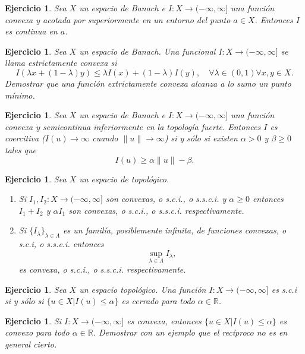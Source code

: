 \documentclass{article}
\newcounter{ejer}
\newtheorem{ejercicio}[ejer]{Ejercicio}}
\newcommand{\rr}{\mathbb{R}}
\begin{document}
\begin{ejercicio} Sea $X$ un espacio de Banach
e $I:X\to (-\infty,\infty]$ una función convexa y acotada por superiormente  en
un entorno del punto $a\in X$.  Entonces  $I$ es continua en $a$.
\end{ejercicio}
\begin{ejercicio} Sea $X$ un espacio de Banach. Una funcional $I:X\to (-\infty,\infty]$ se llama \emph{estrictamente convexa} si
\[I(\lambda x+(1-\lambda)y)\leq \lambda I(x)+(1-\lambda)I(y),\quad\forall\lambda\in(0,1)\forall x,y\in X.\]
Demostrar que una función extrictamente convexa alcanza a lo sumo un punto mínimo.

\end{ejercicio}

\begin{ejercicio}
Sea $X$ un espacio de Banach
e $I:X\to (-\infty,\infty]$ una función convexa  y semicontinua inferiormente en la topología fuerte. Entonces $I$ es coercitiva ($I(u)\to\infty$ cuando $\|u\|\to\infty$) si y sólo si existen $\alpha>0$ y $\beta\geq 0$ tales que
\[I(u)\geq \alpha \|u\|-\beta.\]
\end{ejercicio}

\begin{ejercicio} Sea $X$ un espacio de topológico.
\begin{enumerate}
 \item  Si $I_1,I_2:X\to (-\infty,\infty]$ son convexas, o s.c.i., o s.s.c.i. y $\alpha\geq 0$ entonces $I_1+I_2$ y $\alpha I_1$ son convexas, o s.c.i., o s.s.c.i. respectivamente.
 \item Si $\{I_{\lambda}\}_{\lambda\in\Lambda}$ es un familía, posiblemente infinita, de funciones convexas, o s.c.i, o s.s.c.i. entonces
 \[\sup_{\lambda\in\Lambda}I_{\lambda}, \]
es convexa, o s.c.i., o s.s.c.i. respectivamente.

\end{enumerate}

\end{ejercicio}



\begin{ejercicio} Sea $X$ un espacio topológico. Una función $I:X\to (-\infty,\infty]$  es s.c.i si y sólo si $\{u\in X|I(u)\leq \alpha\}$ es cerrado para todo $\alpha\in\rr$.

\end{ejercicio}

\begin{ejercicio} Si $I:X\to (-\infty,\infty]$  es convexa, entonces $\{u\in X|I(u)\leq \alpha\}$ es convexo para todo $\alpha\in\rr$. Demostrar con un ejemplo que el recíproco no es en general cierto.

\end{ejercicio}
\end{document}
